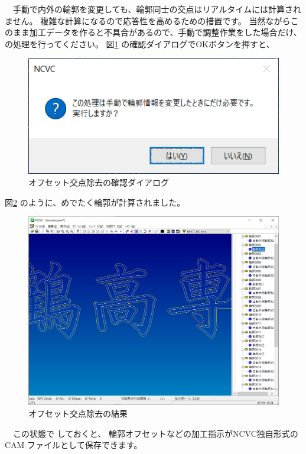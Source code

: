 

\vspace*{1zh}
　手動で内外の輪郭を変更しても、輪郭同士の交点はリアルタイムには計算されません。
複雑な計算になるので応答性を高めるための措置です。
当然ながらこのまま加工データを作ると不具合があるので、手動で調整作業をした場合だけ、
 の処理を行ってください。
図\ref{fig:offset1.png} の確認ダイアログでOKボタンを押すと、

\begin{figure}[H]
\centering
\includegraphics{No4/fig/dialog.png}
\caption{オフセット交点除去の確認ダイアログ}
\label{fig:offset1.png}
\end{figure}

図\ref{fig:offset2.png} のように、めでたく輪郭が計算されました。

\begin{figure}[H]
\centering
\includegraphics[scale=0.55]{No4/fig/offset.png}
\caption{オフセット交点除去の結果}
\label{fig:offset2.png}
\end{figure}

　この状態で しておくと、
輪郭オフセットなどの加工指示がNCVC独自形式の CAM ファイルとして保存できます。